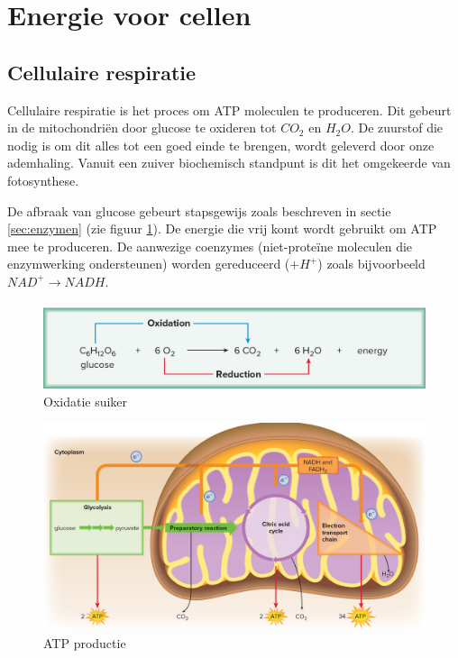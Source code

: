 \documentclass[a4paper,kul]{kulakarticle} %
\begin{document}
\section{Energie voor cellen}
\subsection{Cellulaire respiratie}
Cellulaire respiratie is het proces om ATP moleculen te produceren. Dit gebeurt in de mitochondriën door glucose te oxideren tot $CO_2$ en $H_2O$. De zuurstof die nodig is om dit alles tot een goed einde te brengen, wordt geleverd door onze ademhaling. Vanuit een zuiver biochemisch standpunt is dit het omgekeerde van fotosynthese. 

De afbraak van glucose gebeurt stapsgewijs zoals beschreven in sectie \ref{sec:enzymen} (zie figuur \ref{fig:oxidatiesuiker}). De energie die vrij komt wordt gebruikt om ATP mee te produceren. De aanwezige coenzymes (niet-proteïne moleculen die enzymwerking ondersteunen) worden gereduceerd ($+H^+$) zoals bijvoorbeeld $NAD^+ \rightarrow NADH$.
\begin{figure}[h]
	\centering
	\includegraphics[width=0.7\linewidth]{OxidatieSuiker}
	\caption[Oxidatie suiker]{Oxidatie suiker}
	\label{fig:oxidatiesuiker}
\end{figure}
\begin{figure}[h]
	\centering
	\includegraphics[width=0.7\linewidth]{ATPProductie}
	\caption[ATP productie]{ATP productie}
	\label{fig:atpproductie}
\end{figure}\\
\newpage
\end{document}
